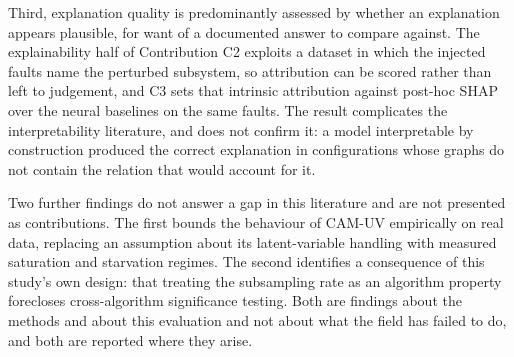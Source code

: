 Third, explanation quality is predominantly assessed by whether an explanation appears plausible, for want of a documented answer to compare against. The explainability half of Contribution C2 exploits a dataset in which the injected faults name the perturbed subsystem, so attribution can be scored rather than left to judgement, and C3 sets that intrinsic attribution against post-hoc SHAP over the neural baselines on the same faults. The result complicates the interpretability literature, and does not confirm it: a model interpretable by construction produced the correct explanation in configurations whose graphs do not contain the relation that would account for it.

Two further findings do not answer a gap in this literature and are not presented as contributions. The first bounds the behaviour of CAM-UV empirically on real data, replacing an assumption about its latent-variable handling with measured saturation and starvation regimes. The second identifies a consequence of this study's own design: that treating the subsampling rate as an algorithm property forecloses cross-algorithm significance testing. Both are findings about the methods and about this evaluation and not about what the field has failed to do, and both are reported where they arise.
